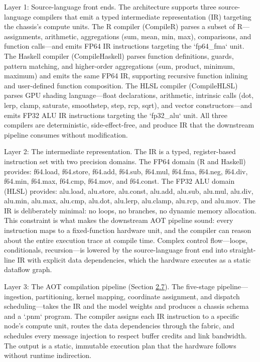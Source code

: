 \documentclass[12pt,onecolumn]{article}
\begin{document}
Layer 1: Source-language front ends. The architecture supports three source-language compilers that emit a typed intermediate representation (IR)\cite{18} targeting the chassis's compute units. The R compiler (CompileR) parses a subset of R---assignments, arithmetic, aggregations (sum, mean, min, max), comparisons, and function calls---and emits FP64 IR instructions targeting the `fp64\_fma` unit. The Haskell compiler (CompileHaskell) parses function definitions, guards, pattern matching, and higher-order aggregations (sum, product, minimum, maximum) and emits the same FP64 IR, supporting recursive function inlining and user-defined function composition. The HLSL compiler (CompileHLSL) parses GPU shading language---float declarations, arithmetic, intrinsic calls (dot, lerp, clamp, saturate, smoothstep, step, rcp, sqrt), and vector constructors---and emits FP32 ALU IR instructions targeting the `fp32\_alu` unit. All three compilers are deterministic, side-effect-free, and produce IR that the downstream pipeline consumes without modification.

Layer 2: The intermediate representation. The IR is a typed, register-based instruction set with two precision domains. The FP64 domain (R and Haskell) provides: f64.load, f64.store, f64.add, f64.sub, f64.mul, f64.fma, f64.neg, f64.div, f64.min, f64.max, f64.cmp, f64.mov, and f64.const. The FP32 ALU domain (HLSL) provides: alu.load, alu.store, alu.const, alu.add, alu.sub, alu.mul, alu.div, alu.min, alu.max, alu.cmp, alu.dot, alu.lerp, alu.clamp, alu.rcp, and alu.mov. The IR is deliberately minimal: no loops, no branches, no dynamic memory allocation. This constraint is what makes the downstream AOT pipeline sound: every instruction maps to a fixed-function hardware unit, and the compiler can reason about the entire execution trace at compile time. Complex control flow---loops, conditionals, recursion---is lowered by the source-language front end into straight-line IR with explicit data dependencies, which the hardware executes as a static dataflow graph.

Layer 3: The AOT compilation pipeline (Section \hyperref[sec:2.7]{2.7}). The five-stage pipeline---ingestion, partitioning, kernel mapping, coordinate assignment, and dispatch scheduling---takes the IR and the model weights and produces a chassis schema and a `.pnm` program. The compiler assigns each IR instruction to a specific node's compute unit, routes the data dependencies through the fabric, and schedules every message injection to respect buffer credits and link bandwidth. The output is a static, immutable execution plan that the hardware follows without runtime indirection.
\end{document}
